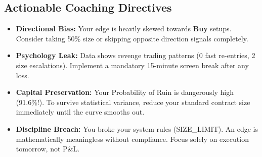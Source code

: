 \documentclass[11pt,a4paper]{article}
\begin{document}
\subsection*{Actionable Coaching Directives}
\begin{tcolorbox}[colframe=badred!80!black, colback=surface, title=Critical Focus Areas]
\begin{itemize}

\item \textbf{Directional Bias:} Your edge is heavily skewed towards \textbf{Buy} setups. Consider taking 50\% size or skipping opposite direction signals completely.

\item \textbf{Psychology Leak:} Data shows revenge trading patterns (0 fast re-entries, 2 size escalations). Implement a mandatory 15-minute screen break after any loss.

\item \textbf{Capital Preservation:} Your Probability of Ruin is dangerously high (91.6\%!). To survive statistical variance, reduce your standard contract size immediately until the curve smooths out.

\item \textbf{Discipline Breach:} You broke your system rules (SIZE\_LIMIT). An edge is mathematically meaningless without compliance. Focus solely on execution tomorrow, not P\&L.

\end{itemize}
\end{tcolorbox}
\end{document}
